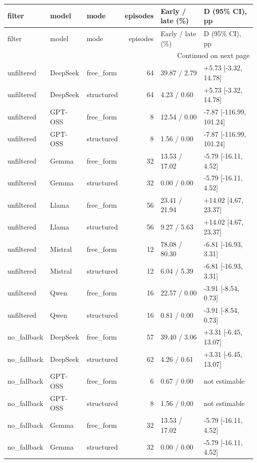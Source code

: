 \begin{longtable}{lllrll}
\toprule
filter & model & mode & episodes & Early / late (\%) & D (95\% CI), pp \\
\midrule
\endfirsthead
\toprule
filter & model & mode & episodes & Early / late (\%) & D (95\% CI), pp \\
\midrule
\endhead
\midrule
\multicolumn{6}{r}{Continued on next page} \\
\midrule
\endfoot
\bottomrule
\endlastfoot
unfiltered & DeepSeek & free\_form & 64 & 39.87 / 2.79 & +5.73 [-3.32, 14.78] \\
unfiltered & DeepSeek & structured & 64 & 4.23 / 0.60 & +5.73 [-3.32, 14.78] \\
unfiltered & GPT-OSS & free\_form & 8 & 12.54 / 0.00 & -7.87 [-116.99, 101.24] \\
unfiltered & GPT-OSS & structured & 8 & 1.56 / 0.00 & -7.87 [-116.99, 101.24] \\
unfiltered & Gemma & free\_form & 32 & 13.53 / 17.02 & -5.79 [-16.11, 4.52] \\
unfiltered & Gemma & structured & 32 & 0.00 / 0.00 & -5.79 [-16.11, 4.52] \\
unfiltered & Llama & free\_form & 56 & 23.41 / 21.94 & +14.02 [4.67, 23.37] \\
unfiltered & Llama & structured & 56 & 9.27 / 5.63 & +14.02 [4.67, 23.37] \\
unfiltered & Mistral & free\_form & 12 & 78.08 / 80.30 & -6.81 [-16.93, 3.31] \\
unfiltered & Mistral & structured & 12 & 6.04 / 5.39 & -6.81 [-16.93, 3.31] \\
unfiltered & Qwen & free\_form & 16 & 22.57 / 0.00 & -3.91 [-8.54, 0.73] \\
unfiltered & Qwen & structured & 16 & 0.81 / 0.00 & -3.91 [-8.54, 0.73] \\
no\_fallback & DeepSeek & free\_form & 57 & 39.40 / 3.06 & +3.31 [-6.45, 13.07] \\
no\_fallback & DeepSeek & structured & 62 & 4.26 / 0.61 & +3.31 [-6.45, 13.07] \\
no\_fallback & GPT-OSS & free\_form & 6 & 0.67 / 0.00 & not estimable \\
no\_fallback & GPT-OSS & structured & 8 & 1.56 / 0.00 & not estimable \\
no\_fallback & Gemma & free\_form & 32 & 13.53 / 17.02 & -5.79 [-16.11, 4.52] \\
no\_fallback & Gemma & structured & 32 & 0.00 / 0.00 & -5.79 [-16.11, 4.52] \\

\end{longtable}
